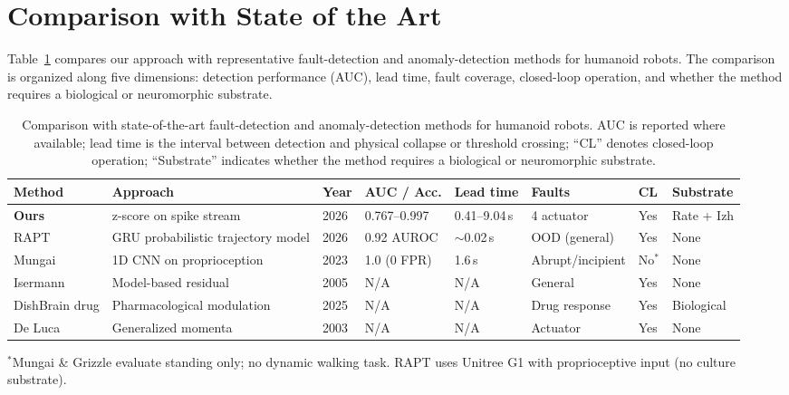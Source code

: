 \section{Comparison with State of the Art}

Table~\ref{tab:sota} compares our approach with representative fault-detection
and anomaly-detection methods for humanoid robots. The comparison is organized
along five dimensions: detection performance (AUC), lead time, fault coverage,
closed-loop operation, and whether the method requires a biological or
neuromorphic substrate.

\begin{table}[t]
\centering
\caption{Comparison with state-of-the-art fault-detection and anomaly-detection
methods for humanoid robots. AUC is reported where available; lead time is the
interval between detection and physical collapse or threshold crossing; ``CL''
denotes closed-loop operation; ``Substrate'' indicates whether the method
requires a biological or neuromorphic substrate.}
\label{tab:sota}
\small
\renewcommand{\arraystretch}{1.15}
\begin{tabular}{@{}p{3.2em}p{5.5em}p{3em}p{4em}p{3.5em}p{2.5em}p{2em}p{4em}@{}}
\toprule
\textbf{Method} & \textbf{Approach} & \textbf{Year} & \textbf{AUC / Acc.}
  & \textbf{Lead time} & \textbf{Faults} & \textbf{CL} & \textbf{Substrate}\\
\midrule
\textbf{Ours}
  & z-score on spike stream
  & 2026 & 0.767--0.997 & 0.41--9.04\,s
  & 4 actuator & Yes & Rate + Izh \\
\midrule
RAPT \cite{munn2026rapt}
  & GRU probabilistic trajectory model
  & 2026 & 0.92 AUROC & $\sim$0.02\,s
  & OOD (general) & Yes & None \\
\midrule
Mungai \cite{mungai2023fall}
  & 1D CNN on proprioception
  & 2023 & 1.0 (0 FPR) & 1.6\,s
  & Abrupt/incipient & No$^*$ & None \\
\midrule
Isermann \cite{isermann2005}
  & Model-based residual
  & 2005 & N/A & N/A
  & General & Yes & None \\
\midrule
DishBrain drug \cite{kagan2025drug}
  & Pharmacological modulation
  & 2025 & N/A & N/A
  & Drug response & Yes & Biological \\
\midrule
De Luca \cite{deluca2003fdi}
  & Generalized momenta
  & 2003 & N/A & N/A
  & Actuator & Yes & None \\
\bottomrule
\end{tabular}
\vspace{2pt}
\begin{flushleft}
\footnotesize
$^*$Mungai \& Grizzle evaluate standing only; no dynamic walking task.
RAPT uses Unitree G1 with proprioceptive input (no culture substrate).
\end{flushleft}
\end{table}

